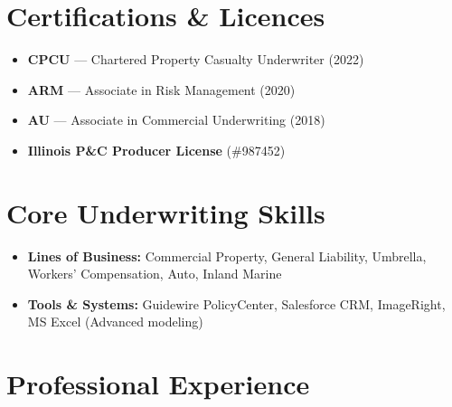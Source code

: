 \documentclass[10pt,letterpaper]{article}
\begin{document}
\noindent
\begin{minipage}[t]{0.48\textwidth}
    \section*{Certifications \& Licences}
    \begin{itemize}[itemsep=3pt]
        \item \textbf{CPCU} --- Chartered Property Casualty Underwriter (2022)
        \item \textbf{ARM} --- Associate in Risk Management (2020)
        \item \textbf{AU} --- Associate in Commercial Underwriting (2018)
        \item \textbf{Illinois P\&C Producer License} (\#987452)
    \end{itemize}
\end{minipage}%
\hfill
\begin{minipage}[t]{0.48\textwidth}
    \section*{Core Underwriting Skills}
    \begin{itemize}[itemsep=3pt]
        \item \textbf{Lines of Business:} Commercial Property, General Liability, Umbrella, Workers' Compensation, Auto, Inland Marine
        \item \textbf{Tools \& Systems:} Guidewire PolicyCenter, Salesforce CRM, ImageRight, MS Excel (Advanced modeling)
    \end{itemize}
\end{minipage}

\vspace{0.8em}

\section*{Professional Experience}
\end{document}

